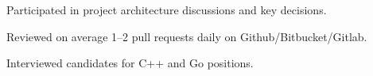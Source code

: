 \begin{zitemize}
\item Participated in project architecture discussions and key decisions.
\item Reviewed on average 1–2 pull requests daily on Github/Bitbucket/Gitlab.
\item Interviewed candidates for C++ and Go positions.
\end{zitemize}
